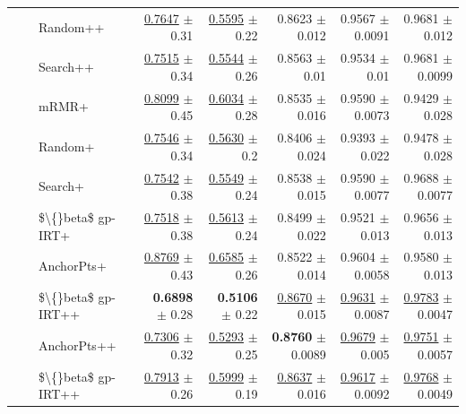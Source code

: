 \begin{longtable}{llp{}rrrrr}
 &  & Random++ & \underline{0.7647} {\scriptsize $\pm$ 0.31} & \underline{0.5595} {\scriptsize $\pm$ 0.22} & 0.8623 {\scriptsize $\pm$ 0.012} & 0.9567 {\scriptsize $\pm$ 0.0091} & 0.9681 {\scriptsize $\pm$ 0.012} \\
 &  & Search++ & \underline{0.7515} {\scriptsize $\pm$ 0.34} & \underline{0.5544} {\scriptsize $\pm$ 0.26} & 0.8563 {\scriptsize $\pm$ 0.01} & 0.9534 {\scriptsize $\pm$ 0.01} & 0.9681 {\scriptsize $\pm$ 0.0099} \\
 &  & mRMR+ & \underline{0.8099} {\scriptsize $\pm$ 0.45} & \underline{0.6034} {\scriptsize $\pm$ 0.28} & 0.8535 {\scriptsize $\pm$ 0.016} & 0.9590 {\scriptsize $\pm$ 0.0073} & 0.9429 {\scriptsize $\pm$ 0.028} \\
 &  & Random+ & \underline{0.7546} {\scriptsize $\pm$ 0.34} & \underline{0.5630} {\scriptsize $\pm$ 0.2} & 0.8406 {\scriptsize $\pm$ 0.024} & 0.9393 {\scriptsize $\pm$ 0.022} & 0.9478 {\scriptsize $\pm$ 0.028} \\
 &  & Search+ & \underline{0.7542} {\scriptsize $\pm$ 0.38} & \underline{0.5549} {\scriptsize $\pm$ 0.24} & 0.8538 {\scriptsize $\pm$ 0.015} & 0.9590 {\scriptsize $\pm$ 0.0077} & 0.9688 {\scriptsize $\pm$ 0.0077} \\
 &  & \$\textbackslash\{\}beta\$ gp-IRT+ & \underline{0.7518} {\scriptsize $\pm$ 0.38} & \underline{0.5613} {\scriptsize $\pm$ 0.24} & 0.8499 {\scriptsize $\pm$ 0.022} & 0.9521 {\scriptsize $\pm$ 0.013} & 0.9656 {\scriptsize $\pm$ 0.013} \\
 &  & AnchorPts+ & \underline{0.8769} {\scriptsize $\pm$ 0.43} & \underline{0.6585} {\scriptsize $\pm$ 0.26} & 0.8522 {\scriptsize $\pm$ 0.014} & 0.9604 {\scriptsize $\pm$ 0.0058} & 0.9580 {\scriptsize $\pm$ 0.013} \\
 &  & \$\textbackslash\{\}beta\$ gp-IRT++ & \textbf{0.6898} {\scriptsize $\pm$ 0.28} & \textbf{0.5106} {\scriptsize $\pm$ 0.22} & \underline{0.8670} {\scriptsize $\pm$ 0.015} & \underline{0.9631} {\scriptsize $\pm$ 0.0087} & \underline{0.9783} {\scriptsize $\pm$ 0.0047} \\
 &  & AnchorPts++ & \underline{0.7306} {\scriptsize $\pm$ 0.32} & \underline{0.5293} {\scriptsize $\pm$ 0.25} & \textbf{0.8760} {\scriptsize $\pm$ 0.0089} & \underline{0.9679} {\scriptsize $\pm$ 0.005} & \underline{0.9751} {\scriptsize $\pm$ 0.0057} \\
 &  & \$\textbackslash\{\}beta\$ gp-IRT++ & \underline{0.7913} {\scriptsize $\pm$ 0.26} & \underline{0.5999} {\scriptsize $\pm$ 0.19} & \underline{0.8637} {\scriptsize $\pm$ 0.016} & \underline{0.9617} {\scriptsize $\pm$ 0.0092} & \underline{0.9768} {\scriptsize $\pm$ 0.0049} \\

\end{longtable}
